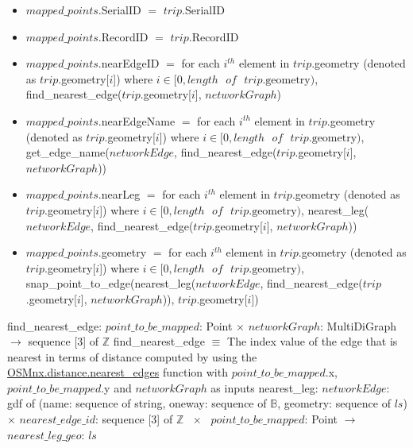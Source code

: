 \documentclass[12pt, titlepage]{article}
\begin{document}
\begin{itemize}
    \item $mapped\_points$.SerialID $=$ $trip$.SerialID
    \item $mapped\_points$.RecordID $=$ $trip$.RecordID
    \item $mapped\_points$.nearEdgeID $=$ for each $i^{th}$ element in $trip$.geometry (denoted as $trip$.geometry[$i$]) where $i \in [0, length \text{ }of\text{ }trip\text{.geometry})$,
    find\_nearest\_edge($trip$.geometry[$i$], $networkGraph$)
    \item $mapped\_points$.nearEdgeName $=$ for each $i^{th}$ element in $trip$.geometry (denoted as $trip$.geometry[$i$]) where $i \in [0, length \text{ }of\text{ }trip\text{.geometry})$,\newline
    get\_edge\_name($networkEdge$, find\_nearest\_edge($trip$.geometry[$i$], $networkGraph$))
    \item $mapped\_points$.nearLeg $=$ for each $i^{th}$ element in $trip$.geometry (denoted as $trip$.geometry[$i$]) where $i \in [0, length \text{ }of\text{ }trip\text{.geometry})$,\newline
    nearest\_leg($networkEdge$, find\_nearest\_edge($trip$.geometry[$i$], $networkGraph$))
    \item $mapped\_points$.geometry $=$ for each $i^{th}$ element in $trip$.geometry (denoted as $trip$.geometry[$i$]) where $i \in [0, length \text{ }of\text{ }trip\text{.geometry})$,\newline
    snap\_point\_to\_edge(nearest\_leg($networkEdge$, find\_nearest\_edge($trip$.geometry[$i$], $networkGraph$)), $trip$.geometry[$i$])
\end{itemize}
find\_nearest\_edge: $point\_to\_be\_mapped$: Point $\times$ $networkGraph$: MultiDiGraph $\rightarrow$ sequence [3] of $\mathbb{Z}$ \newline
find\_nearest\_edge $\equiv$ The index value of the edge that is nearest in terms of distance computed by using the \href{https://osmnx.readthedocs.io/en/stable/osmnx.html#osmnx.distance.nearest_edges}{OSMnx.distance.nearest\_edges} function with $point\_to\_be\_mapped$.x, $point\_to\_be\_mapped$.y and $networkGraph$ as inputs\newline\newline
nearest\_leg: $networkEdge$: gdf of (name: sequence of string, oneway: sequence of $\mathbb{B}$, geometry: sequence of $ls$) $\times$ $nearest\_edge\_id$: sequence [3] of $\mathbb{Z}\text{ } \times\text{ }point\_to\_be\_mapped$: Point $\rightarrow$ $nearest\_leg\_geo$: $ls$ \newline
\end{document}
